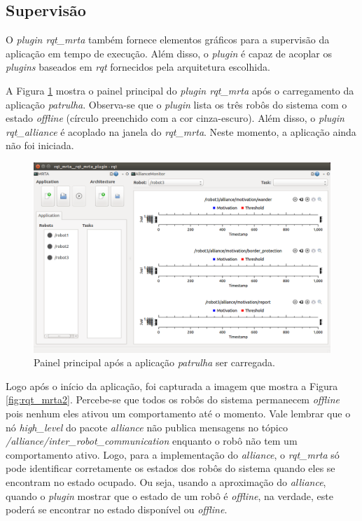         \subsection{Supervisão}
            O \textit{plugin rqt\_mrta} também fornece elementos gráficos para a supervisão da aplicação em tempo de execução. Além disso, o \textit{plugin} é capaz de acoplar os \textit{plugins} baseados em \textit{rqt} fornecidos pela arquitetura escolhida.
            
            A Figura \ref{fig:rqt_mrta1} mostra o painel principal do \textit{plugin rqt\_mrta} após o carregamento da aplicação \textit{patrulha}. Observa-se que o \textit{plugin} lista os três robôs do sistema com o estado \textit{offline} (círculo preenchido com a cor cinza-escuro). Além disso, o \textit{plugin rqt\_alliance} é acoplado na janela do \textit{rqt\_mrta}. Neste momento, a aplicação ainda não foi iniciada.
        
            \begin{figure}[hbt]
                \centering
                \includegraphics[width=.75\textwidth]{Figuras/4_resultados/rqt_mrta1.png}
                \caption{Painel principal após a aplicação \textit{patrulha} ser carregada.} \label{fig:rqt_mrta1}
            \end{figure}
            
            Logo após o início da aplicação, foi capturada a imagem que mostra a Figura \ref{fig:rqt_mrta2}. Percebe-se que todos os robôs do sistema permanecem \textit{offline} pois nenhum eles ativou um comportamento até o momento. Vale lembrar que o nó \textit{high\_level} do pacote \textit{alliance} não publica mensagens no tópico \textit{/alliance/inter\_robot\_communication} enquanto o robô não tem um comportamento ativo. Logo, para a implementação do \textit{alliance}, o \textit{rqt\_mrta} só pode identificar corretamente os estados dos robôs do sistema quando eles se encontram no estado ocupado. Ou seja, usando a aproximação do \textit{alliance}, quando o \textit{plugin} mostrar que o estado de um robô é \textit{offline}, na verdade, este poderá se encontrar no estado disponível ou \textit{offline}.
        
